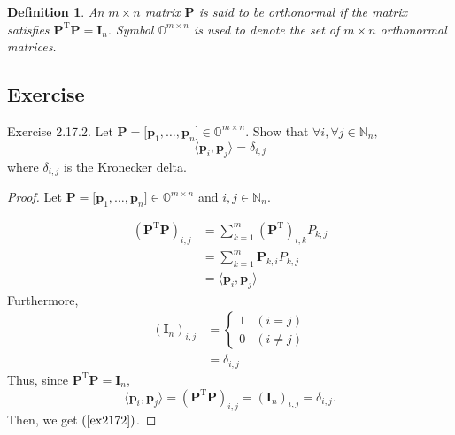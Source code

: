 \documentclass{article}
\theoremstyle{plain}
\newtheorem{dfn}{Definition}[subsection]
\begin{document}
\begin{dfn}
	An $m \times n$ matrix $\bm{P}$ is said to be orthonormal if the matrix satisfies
	\begin{math}
		\bm{P}^\mathrm{T} \bm{P} = \bm{I}_n .
	\end{math}
	Symbol
	\begin{math}
		\mathbb{O}^{m \times n}
	\end{math}
	is used to denote the set of $m \times n$ orthonormal matrices.
\end{dfn}

\subsection{Exercise}

\begin{itembox}[l]{Exercise 2.17.2.}
	Let
	\begin{math}
		\bm{P} = \lbrack \bm{p}_1 , \ldots , \bm{p}_n \rbrack \in \mathbb{O}^{m \times n} .
	\end{math}
	Show that
	\begin{math}
		\forall i , \forall j \in \mathbb{N}_n ,
	\end{math}
	\begin{equation}
		\label{ex2172}
		\langle \bm{p}_i , \bm{p}_j \rangle = \delta_{i,j}
	\end{equation}
	where $\delta_{i,j}$ is the Kronecker delta.
\end{itembox}


\begin{proof}
	Let
	\begin{math}
		\bm{P} = \lbrack \bm{p}_1 , \ldots , \bm{p}_n \rbrack \in \mathbb{O}^{m \times n}
	\end{math}
	and
	\begin{math}
		i , j \in \mathbb{N}_n .
	\end{math}
	
	\begin{equation*}
		\begin{split}
			(\bm{P}^{\mathrm{T}} \bm{P})_{i,j} &= \sum_{k=1}^m (\bm{P}^{\mathrm{T}})_{i,k} P_{k,j} \\
			&= \sum_{k=1}^m \bm{P}_{k,i} P_{k,j} \\
			&= \langle \bm{p}_i , \bm{p}_j \rangle
		\end{split}
	\end{equation*}
	Furthermore,
	\begin{equation*}
		\begin{split}
			(\bm{I}_n)_{i,j} &=
			\begin{cases}
				1 & (i=j) \\
				0 & (i \neq j)
			\end{cases} \\
			&= \delta_{i,j}
		\end{split}
	\end{equation*}
	Thus, since $\bm{P}^{\mathrm{T}} \bm{P} = \bm{I}_n$,
	\begin{equation*}
		\langle \bm{p}_i , \bm{p}_j \rangle = (\bm{P}^{\mathrm{T}} \bm{P})_{i,j} = (\bm{I}_n)_{i,j} = \delta_{i,j} .
	\end{equation*}
	Then, we get $(\ref{ex2172})$.
\end{proof}
\end{document}
